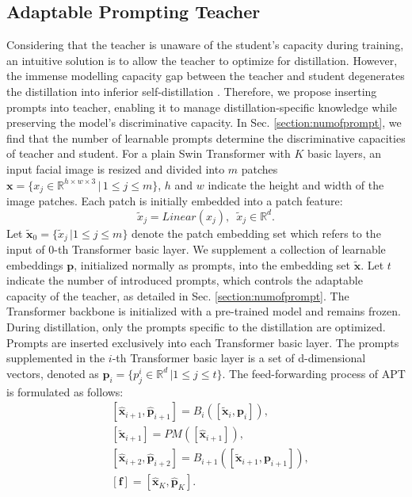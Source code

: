\documentclass[sigconf]{acmart}
\begin{document}
\subsection{Adaptable Prompting Teacher}
Considering that the teacher is unaware of the student's capacity during training, an intuitive solution is to allow the teacher to optimize for distillation. However, the immense modelling capacity gap between the teacher and student degenerates the distillation into inferior self-distillation \cite{switchable}. Therefore, we propose inserting prompts into teacher, enabling it to manage distillation-specific knowledge while preserving the model's discriminative capacity. In Sec. \ref{section:numofprompt}, we find that the number of learnable prompts determine the discriminative capacities of teacher and student. For a plain Swin Transformer \cite{swin} with $K$ basic layers, an input facial image is resized and divided into $m$ patches $\mathbf{x}=\{x_j\in \mathbb{R}^{h\times w\times 3}\, |\,1\le j\le m\}$, $h$ and $w$ indicate the height and width of the image patches. Each patch is initially embedded into a patch feature:
\begin{equation}
\tilde{x}_j = Linear(x_j),\,\,\, \tilde{x}_j \in \mathbb{R}^d.
\label{eq1}
\end{equation}
Let $\tilde{\mathbf{x}}_0=\{\tilde{x}_j\, | 1\le j\le m\}$ denote the patch embedding set which refers to the input of $0$-th Transformer basic layer. We supplement a collection of learnable embeddings $\mathbf{p}$, initialized normally as prompts, into the embedding set $\tilde{\mathbf{x}}$. Let $t$ indicate the number of introduced prompts, which controls the adaptable capacity of the teacher, as detailed in Sec. \ref{section:numofprompt}. The Transformer backbone is initialized with a pre-trained model and remains frozen. During distillation, only the prompts specific to the distillation are optimized. Prompts are inserted exclusively into each Transformer basic layer. The prompts supplemented in the $i$-th Transformer basic layer is a set of d-dimensional vectors, denoted as $\mathbf{p}_i = \{p_j^i \in \mathbb{R}^{d} \,|1\le j\le t\}$. The feed-forwarding process of APT is formulated as follows:
\begin{equation}
\begin{aligned}
&[\hat{\mathbf{x}}_{i+1}, \hat{\mathbf{p}}_{i+1}] = B_i([\tilde{\mathbf{x}}_i, \mathbf{p}_i]),\\
&[\tilde{\mathbf{x}}_{i+1}] = PM([\hat{\mathbf{x}}_{i+1}]),\\
&[\hat{\mathbf{x}}_{i+2}, \hat{\mathbf{p}}_{i+2}] = B_{i+1}([\tilde{\mathbf{x}}_{i+1}, \mathbf{p}_{i+1}]),\\
&[\bm{f}] = [\hat{\mathbf{x}}_{K}, \hat{\mathbf{p}}_{K}].
\end{aligned}
\label{eq2}
\end{equation}
\end{document}
